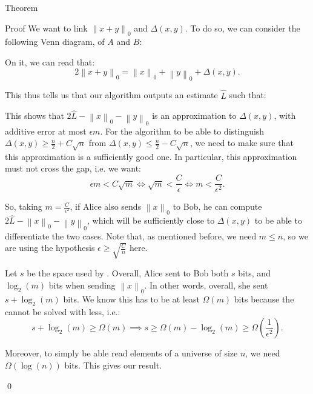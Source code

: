 \documentclass[a4paper]{article}
\begin{document}
\begin{parag}{Theorem}
\begin{subparag}{Proof}
        We want to link $\left\|x + y\right\|_0$ and $\Delta\left(x, y\right)$. To do so, we can consider the following Venn diagram, of $A$ and $B$:

        On it, we can read that:
        \[2 \left\|x + y\right\|_0 = \left\|x\right\|_0 + \left\|y\right\|_0 + \Delta\left(x, y\right).\]

        This thus tells us that our algorithm outputs an estimate $\hat{L}$ such that: 
        
        This shows that $2\hat{L} - \left\|x\right\|_0 - \left\|y\right\|_0$ is an approximation to $\Delta\left(x, y\right)$, with additive error at most $\epsilon m$. For the algorithm to be able to distinguish $\Delta\left(x, y\right) \geq \frac{n}{2} + C \sqrt{n}$ from $\Delta\left(x, y\right) \leq \frac{n}{2} - C\sqrt{n}$, we need to make sure that this approximation is a sufficiently good one. In particular, this approximation must not cross the gap, i.e. we want: 
        \[\epsilon m < C \sqrt{m} \iff \sqrt{m} < \frac{C}{\epsilon} \iff m < \frac{C}{\epsilon^2}.\]

        So, taking $m = \frac{C}{\epsilon^2}$, if Alice also sends $\left\|x\right\|_0$ to Bob, he can compute $2 \hat{L}-  \left\|x\right\|_0 - \left\|y\right\|_0$, which will be sufficiently close to $\Delta\left(x, y\right)$ to be able to differentiate the two cases. Note that, as mentioned before, we need $m \leq n$, so we are using the hypothesis $\epsilon \geq \sqrt{\frac{C}{n}}$ here.

        Let $s$ be the space used by . Overall, Alice sent to Bob both $s$ bits, and $\log_2\left(m\right)$ bits when sending $\left\|x\right\|_0$. In other words, overall, she sent $s + \log_2\left(m\right)$ bits. We know this has to be at least $\Omega\left(m\right)$ bits because the  cannot be solved with less, i.e.: 
        \[s + \log_2\left(m\right) \geq \Omega\left(m\right) \implies s \geq \Omega\left(m\right) - \log_2\left(m\right) \geq \Omega\left(\frac{1}{\epsilon^2}\right).\]

        Moreover, to simply be able read elements of a universe of size $n$, we need $\Omega\left(\log\left(n\right)\right)$ bits. This gives our result.

        \qed
    \end{subparag}
\end{parag}
\end{document}
